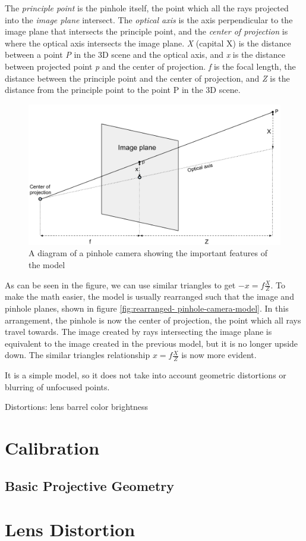 The \emph{principle point} is the pinhole itself, the point which all the rays
projected into the \emph{image plane} intersect. The \emph{optical axis} is
the axis perpendicular to the image plane that intersects the principle point,
and the \emph{center of projection} is where the optical axis intersects the
image plane. \emph{X} (capital X) is the distance between a point \emph{P} in
the 3D scene and the optical axis, and \emph{x} is the distance between
projected point \emph{p} and the center of projection. \emph{f} is the focal
length, the distance between the principle point and the center of projection,
and \emph{Z} is the distance from the principle point to the point P in the 3D
scene.

\begin{figure}[h]
  \centering
  \label{fig:pinhole-camera-model}
  \includegraphics[width=\textwidth]{images/rearranged-Pinhole-camera-model.pdf}
  \caption{A diagram of a pinhole camera showing the important features of the model}
\end{figure}

As can be seen in the figure, we can use similar triangles to get $-x =
f\frac{X}{Z}$. To make the math easier, the model is usually rearranged such
that the image and pinhole planes, shown in figure \ref{fig:rearranged-
pinhole-camera-model}. In this arrangement, the pinhole is now the center of
projection, the point which all rays travel towards. The image created by rays
intersecting the image plane is equivalent to the image created in the
previous model, but it is no longer upside down. The similar triangles
relationship $x = f\frac{X}{Z}$ is now more evident.


It is a simple model, so it does not take into account geometric distortions
or blurring of unfocused points.

Distortions:
    lens barrel
    color
    brightness



\section{Calibration}

\subsection{Basic Projective Geometry}

\section{Lens Distortion}

